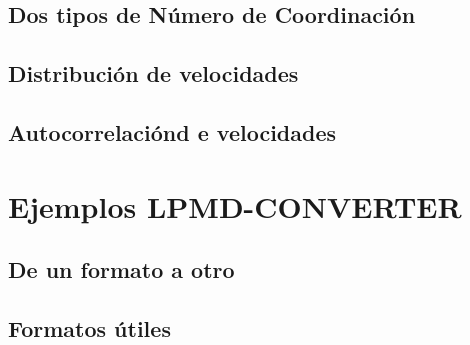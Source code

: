 \subsection{Dos tipos de N\'umero de Coordinaci\'on}

\subsection{Distribuci\'on de velocidades}

\subsection{Autocorrelaci\'ond e velocidades}

\section{Ejemplos LPMD-CONVERTER}

\subsection{De un formato a otro}

\subsection{Formatos \'utiles}

